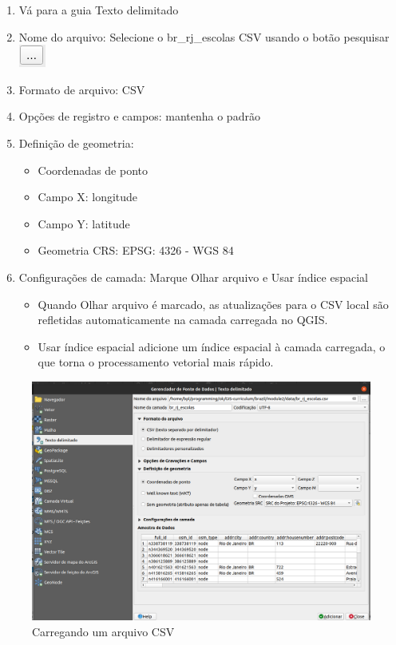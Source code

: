 \documentclass[
  portuguese,
]{krantz}
\providecommand{\tightlist}{%
  \setlength{\itemsep}{0pt}\setlength{\parskip}{0pt}}
\begin{document}
\begin{enumerate}
\begin{enumerate}
    \begin{enumerate}
    \def\labelenumiii{\arabic{enumiii}.}
    \item
      Vá para a guia Texto delimitado
    \item
      Nome do arquivo: Selecione o br\_rj\_escolas CSV usando o botão pesquisar \includegraphics{media/modulo2/data-source-manager-search.png}
    \item
      Formato de arquivo: CSV
    \item
      Opções de registro e campos: mantenha o padrão
    \item
      Definição de geometria:

      \begin{itemize}
      \tightlist
      \item
        Coordenadas de ponto
      \item
        Campo X: longitude
      \item
        Campo Y: latitude
      \item
        Geometria CRS: EPSG: 4326 - WGS 84
      \end{itemize}
    \item
      Configurações de camada: Marque Olhar arquivo e Usar índice espacial

      \begin{itemize}
      \tightlist
      \item
        Quando Olhar arquivo é marcado, as atualizações para o CSV local são refletidas automaticamente na camada carregada no QGIS.
      \item
        Usar índice espacial adicione um índice espacial à camada carregada, o que torna o processamento vetorial mais rápido.
      \end{itemize}
    \end{enumerate}
  \end{enumerate}
\end{enumerate}

\begin{figure}
\centering
\includegraphics{media/modulo2/data-source-manager-csv.png}
\caption{Carregando um arquivo CSV}
\end{figure}
\end{document}
